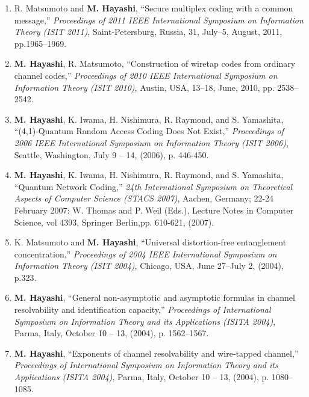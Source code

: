 \documentclass[a4paper,12pt,oneside]{article}
\begin{document}
\begin{enumerate}
    \item R. Matsumoto and \textbf{M. Hayashi}, 
    ``Secure multiplex coding with a common message,'' 
    {\em Proceedings of 2011 IEEE International Symposium on Information Theory (ISIT 2011)}, 
    Saint-Petersburg, Russia, 31, July--5, August, 2011, pp.1965--1969.
    
    \item	\textbf{M. Hayashi}, R. Matsumoto, 
    ``Construction of wiretap codes from ordinary channel codes,'' 
    {\em Proceedings of 2010 IEEE International Symposium on Information Theory (ISIT 2010)}, 
    Austin, USA, 13--18, June, 2010, pp. 2538--2542.
    
    \item
    \textbf{M. Hayashi}, K. Iwama, H. Nishimura, R. Raymond, and S. Yamashita, ``(4,1)-Quantum Random Access Coding Does Not Exist,'' 
    {\em Proceedings of 2006 IEEE International Symposium on Information Theory (ISIT 2006)}, 
    Seattle, Washington, July 9 -- 14, (2006), p. 446-450.
    
    \item
    \textbf{M. Hayashi}, K. Iwama, H. Nishimura, R. Raymond, and S. Yamashita, ``Quantum Network Coding,'' 
    {\em 24th International Symposium on Theoretical Aspects of Computer Science (STACS 2007)}, Aachen, Germany; 22-24 February 2007: 
    W. Thomas and P. Weil (Eds.), Lecture Notes in Computer Science, vol 4393, Springer Berlin,pp. 610-621, (2007). 
    
    \item
    K. Matsumoto and \textbf{M. Hayashi}, ``Universal distortion-free entanglement concentration,'' 
    {\em Proceedings of 2004 IEEE International Symposium on Information Theory (ISIT 2004)}, 
    Chicago, USA, June 27--July 2, (2004), p.323.
    
    \item
    \textbf{M. Hayashi}, ``General non-asymptotic and asymptotic formulas in channel resolvability and identification capacity,'' 
    {\em Proceedings of International Symposium on Information Theory and its Applications (ISITA 2004)}, Parma, Italy, October 10 -- 13, (2004), p. 1562--1567.
    
    \item
    \textbf{M. Hayashi}, ``Exponents of channel resolvability and wire-tapped channel,'' 
    {\em Proceedings of International Symposium on Information Theory and its Applications (ISITA 2004)}, Parma, Italy, October 10 -- 13, (2004), p. 1080--1085.
    

\end{enumerate}
\end{document}
